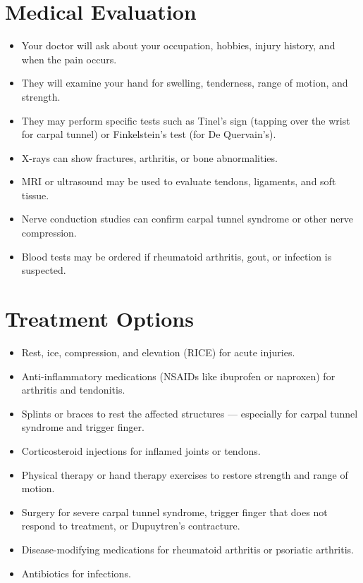 \section*{Medical Evaluation}
\begin{itemize}
  \item Your doctor will ask about your occupation, hobbies, injury history, and when the pain occurs.
  \item They will examine your hand for swelling, tenderness, range of motion, and strength.
  \item They may perform specific tests such as Tinel's sign (tapping over the wrist for carpal tunnel) or Finkelstein's test (for De Quervain's).
  \item X-rays can show fractures, arthritis, or bone abnormalities.
  \item MRI or ultrasound may be used to evaluate tendons, ligaments, and soft tissue.
  \item Nerve conduction studies can confirm carpal tunnel syndrome or other nerve compression.
  \item Blood tests may be ordered if rheumatoid arthritis, gout, or infection is suspected.
\end{itemize}

\section*{Treatment Options}
\begin{itemize}
  \item Rest, ice, compression, and elevation (RICE) for acute injuries.
  \item Anti-inflammatory medications (NSAIDs like ibuprofen or naproxen) for arthritis and tendonitis.
  \item Splints or braces to rest the affected structures — especially for carpal tunnel syndrome and trigger finger.
  \item Corticosteroid injections for inflamed joints or tendons.
  \item Physical therapy or hand therapy exercises to restore strength and range of motion.
  \item Surgery for severe carpal tunnel syndrome, trigger finger that does not respond to treatment, or Dupuytren's contracture.
  \item Disease-modifying medications for rheumatoid arthritis or psoriatic arthritis.
  \item Antibiotics for infections.
\end{itemize}

